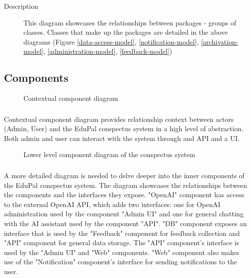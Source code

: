 \documentclass[
    english, %
]{VUMIFPSkursinis}
\begin{document}
\begin{description}
    \item[Description] This diagram showcases the relationships between packages - groups of classes. Classes that make up the packages are detailed in the above diagrams (Figure \ref{data-access-model}, \ref{notification-model}, \ref{archivation-model}, \ref{administration-model}, \ref{feedback-model})
\end{description}

\subsection{Components}

\begin{figure}[ht]
    \centering
    
    \label{component-level-1}
    \caption{Contextual component diagram}
\end{figure}

\subsubsection*{} Contextual component diagram provides relationship context between actors (Admin, User) and the EduPal conspectus system in a high level of abstraction. Both admin and user can interact with the system through and API and a UI.

\begin{figure}[ht]
    \centering
    
    \label{component-level-2}
    \caption{Lower level component diagram of the conspectus system}
\end{figure}

\subsubsection*{} A more detailed diagram is needed to delve deeper into the inner components of the EduPal conspectus system. The diagram showcases the relationships between the components and the interfaces they expose. "OpenAI" component has access to the external OpenAI API, which adds two interfaces: one for OpenAI administration used by the component "Admin UI" and one for general chatting with the AI assistant used by the component "API". "DB" component exposes an interface that is used by the "Feedback" component for feedback collection and "API" component for general data storage. The "API" component's interface is used by the "Admin UI" and "Web" components. "Web" component also makes use of the "Notification" component's interface for sending notifications to the user.
\end{document}
